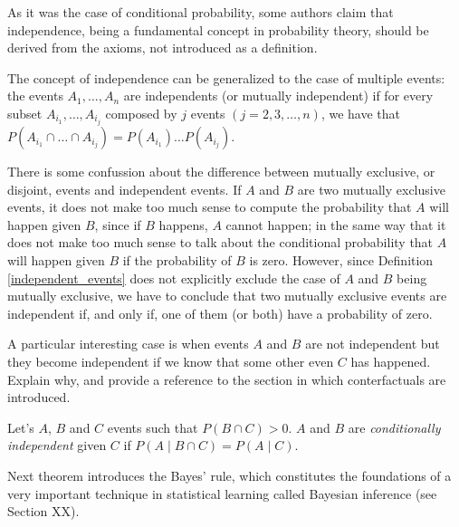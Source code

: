 As it was the case of conditional probability, some authors claim that independence, being a fundamental concept in probability theory, should be derived from the axioms, not introduced as a definition.

The concept of independence can be generalized to the case of multiple events: the events $A_{1}, \ldots, A_{n}$ are independents (or mutually independent) if for every subset $A_{i_1}, \ldots, A_{i_j}$ composed by $j$ events $\left( j = 2, 3, \ldots, n \right)$, we have that $P \left( A_{i_1} \cap \ldots \cap A_{i_j} \right) = P \left( A_{i_1} \right) \ldots P \left( A_{i_j}\right)$.

\begin{example}
There is some confussion about the difference between mutually exclusive, or disjoint, events and independent events. If $A$ and $B$ are two mutually exclusive events, it does not make too much sense to compute the probability that $A$ will happen given $B$, since if $B$ happens, $A$ cannot happen; in the same way that it does not make too much sense to talk about the conditional probability that $A$ will happen given $B$ if the probability of $B$ is zero. However, since Definition \ref{independent_events} does not explicitly exclude the case of $A$ and $B$ being mutually exclusive, we have to conclude that two mutually exclusive events are independent if, and only if, one of them (or both) have a probability of zero.
\end{example}

A particular interesting case is when events $A$ and $B$ are not independent but they become independent if we know that some other even $C$ has happened. {\color{red} Explain why, and provide a reference to the section in which conterfactuals are introduced.}

\begin{definition}
Let's $A$, $B$ and $C$ events such that $P\left( B \cap C \right)>0$. $A$ and $B$ are \emph{conditionally independent} given $C$ if $P\left(A \mid B \cap C \right) = P\left( A \mid C \right)$.
\end{definition}

Next theorem introduces the Bayes' rule, which constitutes the foundations of a very important technique in statistical learning called Bayesian inference (see Section {\color{red} XX}). 

